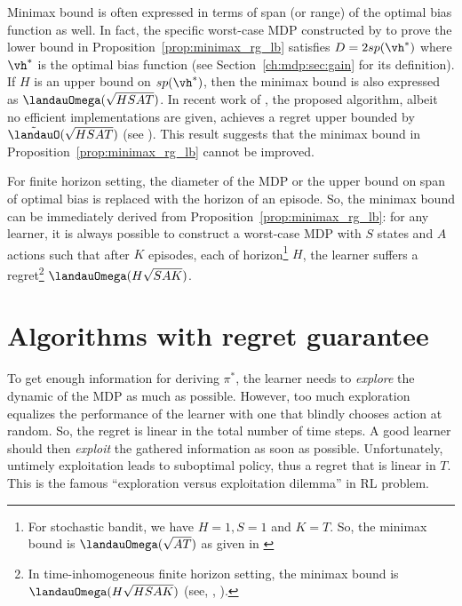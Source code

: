 Minimax bound is often expressed in terms of span (or range) of the optimal bias function as well.
In fact, the specific worst-case MDP constructed by \cite{jaksch2010near} to prove the lower bound in Proposition~\ref{prop:minimax_rg_lb} satisfies $D=2sp(\vh^*)$ where $\vh^*$ is the optimal bias function (see Section~\ref{ch:mdp:sec:gain} for its definition).
If $H$ is an upper bound on $sp(\vh^*)$, then the minimax bound is also expressed as $\landauOmega(\sqrt{HSAT})$.
In recent work of \cite{zhang2019regret}, the proposed algorithm, albeit no efficient implementations are given, achieves a regret upper bounded by $\tilde{\landauO}(\sqrt{HSAT})$ (see \cite[Theorem~1]{zhang2019regret}).
This result suggests that the minimax bound in Proposition~\ref{prop:minimax_rg_lb} cannot be improved.

For finite horizon setting, the diameter of the MDP or the upper bound on span of optimal bias is replaced with the horizon of an episode.
So, the minimax bound can be immediately derived from Proposition~\ref{prop:minimax_rg_lb}: for any learner, it is always possible to construct a worst-case MDP with $S$ states and $A$ actions such that after $K$ episodes, each of horizon\footnote{For stochastic bandit, we have $H=1, S=1$ and $K=T$. So, the minimax bound is $\landauOmega(\sqrt{AT})$ as given in \cite{bubeck2012regret}} $H$, the learner suffers a regret\footnote{In time-inhomogeneous finite horizon setting, the minimax bound is $\landauOmega(H\sqrt{HSAK})$ (see, \eg, \cite{jin2018q, domingues2021episodic}).} $\landauOmega(H\sqrt{SAK})$.


\section{Algorithms with regret guarantee}
\label{ch:rl:sec:opt_post}

To get enough information for deriving $\pi^*$, the learner needs to \emph{explore} the dynamic of the MDP as much as possible.
However, too much exploration equalizes the performance of the learner with one that blindly chooses action at random.
So, the regret is linear in the total number of time steps.
A good learner should then \emph{exploit} the gathered information as soon as possible.
Unfortunately, untimely exploitation leads to suboptimal policy, thus a regret that is linear in $T$. This is the famous “exploration versus exploitation dilemma” in RL problem.

